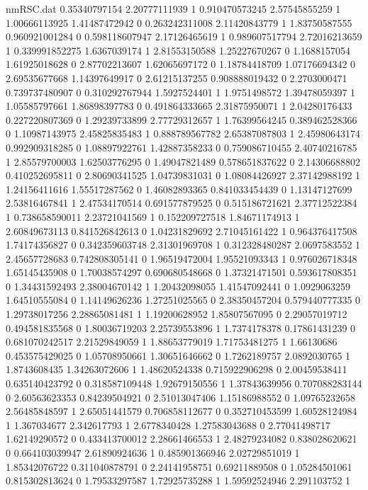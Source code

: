 \begin{filecontents}{nmRSC.dat}
0.35340797154 2.20777111939 1
0.910470573245 2.57545855259 1
1.00666113925 1.41487472942 0
0.263242311008 2.11420843779 1
1.83750587555 0.960921001284 0
0.598118607947 2.17126465619 1
0.989607517794 2.72016213659 1
0.339991852275 1.6367039174 1
2.81553150588 1.25227670267 0
1.1688157054 1.61925018628 0
2.87702213607 1.62065697172 0
1.18784418709 1.07176694342 0
2.69535677668 1.14397649917 0
2.61215137255 0.908888019432 0
2.2703000471 0.739737480907 0
0.310292767944 1.5927524401 1
1.9751498572 1.39478059397 1
1.05585797661 1.86898397783 0
0.491864333665 2.31875950071 1
2.04280176433 0.227220807369 0
1.29239733899 2.77729312657 1
1.76399564245 0.389462528366 0
1.10987143975 2.45825835483 1
0.888789567782 2.65387087803 1
2.45980643174 0.992909318285 0
1.08897922761 1.42887358233 0
0.759086710455 2.40740216785 1
2.85579700003 1.62503776295 0
1.49047821489 0.578651837622 0
2.14306688802 0.410252695811 0
2.80690341525 1.04739831031 0
1.08084426927 2.37142988192 1
1.24156411616 1.55517287562 0
1.46082893365 0.841033454439 0
1.13147127699 2.53816467841 1
2.47534170514 0.691577879525 0
0.515186721621 2.37712522384 1
0.738658590011 2.23721041569 1
0.152209727518 1.84671174913 1
2.60849673113 0.841526842613 0
1.04231829692 2.71045161422 1
0.964376417508 1.74174356827 0
0.342359603748 2.31301969708 1
0.312328480287 2.0697583552 1
2.45657728683 0.742808305141 0
1.96519472004 1.95521093343 1
0.976026718348 1.65145435908 0
1.70038574297 0.690680548668 0
1.37321471501 0.593617808351 0
1.34431592493 2.38004670142 1
1.20432098055 1.41547092441 0
1.0929063259 1.64510555084 0
1.14149626236 1.27251025565 0
2.38350457204 0.579440777335 0
1.29738017256 2.28865081481 1
1.19200628952 1.85807567095 0
2.29057019712 0.494581835568 0
1.80036719203 2.25739553896 1
1.7374178378 0.17861431239 0
0.681070242517 2.21529849059 1
1.88653779019 1.71753481275 1
1.66130686 0.453575429025 0
1.05708950661 1.30651646662 0
1.7262189757 2.0892030765 1
1.8743608435 1.34263072606 1
1.48620524338 0.715922906298 0
2.00459538411 0.635140423792 0
0.318587109448 1.92679150556 1
1.37843639956 0.707088283144 0
2.60563623353 0.84239504921 0
2.51013047406 1.15186988552 0
1.09765232658 2.56485848597 1
2.65051441579 0.706858112677 0
0.352710453599 1.60528124984 1
1.367034677 2.342617793 1
2.6778340428 1.27583043688 0
2.77041498717 1.62149290572 0
0.433413700012 2.28661466553 1
2.48279234082 0.838028620621 0
0.664103039947 2.61890924636 1
0.485901366946 2.02729851019 1
1.85342076722 0.311040878791 0
2.24141958751 0.69211889508 0
1.05284501061 0.815302813624 0
1.79533297587 1.72925735288 1
1.59592524946 2.291103752 1

\end{filecontents}
